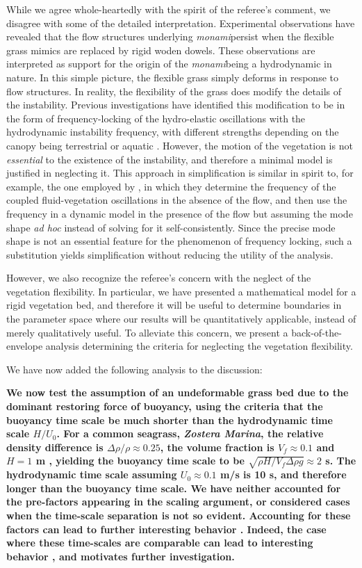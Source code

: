 \documentclass[letterpaper,10pt]{article}
\newcommand{\monami}{\textit{monami}}
\begin{document}
\begin{enumerate}
While we agree whole-heartedly with the spirit of the referee's comment, we disagree with some of the detailed interpretation. 
Experimental observations have revealed that the flow structures underlying \monami persist when the flexible grass mimics are replaced by rigid woden dowels.
These observations are interpreted as support for the origin of the \monami being a hydrodynamic in nature.
In this simple picture, the flexible grass simply deforms in response to flow structures.
In reality, the flexibility of the grass does modify the details of the instability.
Previous investigations have identified this modification to be in the form of frequency-locking of the hydro-elastic oscillations with the hydrodynamic instability frequency, with different strengths depending on the canopy being terrestrial \citep{Delangre04,Delangre06} or aquatic \cite{Gosselin2009}.
However, the motion of the vegetation is not \textit{essential} to the existence of the instability, and therefore a minimal model is justified in neglecting it.
This approach in simplification is similar in spirit to, for example, the one employed by \cite{Gosselin2009}, in which they determine the frequency of the coupled fluid-vegetation oscillations in the absence of the flow, and then use the frequency in a dynamic model in the presence of the flow but assuming the mode shape \textit{ad hoc} instead of solving for it self-consistently. 
Since the precise mode shape is not an essential feature for the phenomenon of frequency locking, such a substitution yields simplification without reducing the utility of the analysis.

However, we also recognize the referee's concern with the neglect of the vegetation flexibility.
In particular, we have presented a mathematical model for a rigid vegetation bed, and therefore it will be useful to determine boundaries in the parameter space where our results will be quantitatively applicable, instead of merely qualitatively useful.
To alleviate this concern, we present a back-of-the-envelope analysis determining the criteria for neglecting the vegetation flexibility.

We have now added the following analysis to the discussion:

\textbf{
We now test the assumption of an undeformable grass bed due to the dominant restoring force of buoyancy, using the criteria that the buoyancy time scale be much shorter than the hydrodynamic time scale $H/U_0$.
For a common seagrass, \textit{Zostera Marina}, the relative density difference is $\Delta \rho /\rho \approx 0.25$, the volume fraction is $V_f \approx 0.1$ and $H=1$ m \citep{Fonseca98}, yielding the buoyancy time scale to be $\sqrt{\rho H/V_f \Delta \rho g} \approx 2$ s.
The hydrodynamic time scale assuming $U_0 \approx 0.1$ m/s is 10 s, and therefore longer than the buoyancy time scale.
We have neither accounted for the pre-factors appearing in the scaling argument, or considered cases when the time-scale separation is not so evident. 
Accounting for these factors  can lead to further interesting behavior \citep{Delangre06,Gosselin2009}.
Indeed, the case where these time-scales are comparable can lead to interesting behavior \citep{Delangre06}, and motivates further investigation. 
}


\end{enumerate}
\end{document}
